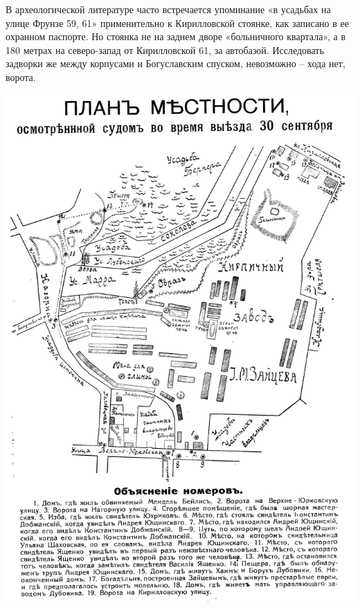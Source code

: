 В археологической литературе часто встречается упоминание «в усадьбах на улице Фрунзе 59, 61» применительно к Кирилловской стоянке, как записано в ее охранном паспорте. Но стоянка не на заднем дворе «больничного квартала», а в 180 метрах на северо-запад от Кирилловской 61, за автобазой. Исследовать задворки же между корпусами и Богуславским спуском, невозможно – хода нет, ворота.%

\newpage
\vspace*{\fill}
\begin{center}
\includegraphics[width=\linewidth]{chast-kirvys/beylis/1913-karta.jpg}
\end{center}
\vspace*{\fill}
\newpage

